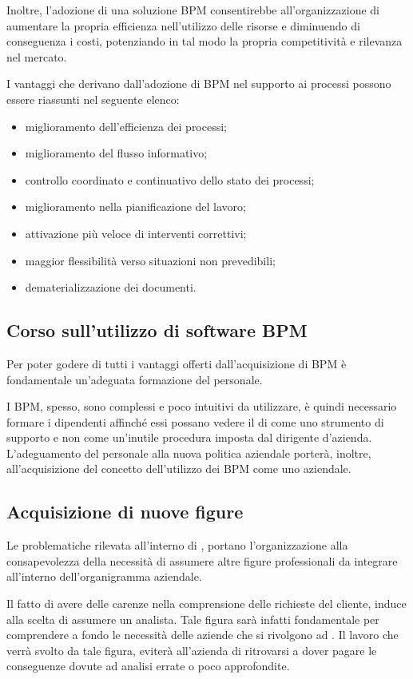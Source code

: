 Inoltre, l'adozione di una soluzione BPM consentirebbe all'organizzazione di aumentare la propria efficienza nell'utilizzo delle risorse e diminuendo di conseguenza i costi, potenziando in tal modo la propria competitività e rilevanza nel mercato.

I vantaggi che derivano dall'adozione di \sw BPM nel supporto ai processi possono essere riassunti nel seguente elenco:

\begin{itemize}
	\item miglioramento dell'efficienza dei processi;
	\item miglioramento del flusso informativo;
	\item controllo coordinato e continuativo dello stato dei processi;
	\item miglioramento nella pianificazione del lavoro;
	\item attivazione più veloce di interventi correttivi;
	\item maggior flessibilità verso situazioni non prevedibili;
	\item dematerializzazione dei documenti.
\end{itemize}


\subsection{Corso sull'utilizzo di software BPM}
Per poter godere di tutti i vantaggi offerti dall'acquisizione di \sw BPM è fondamentale un'adeguata formazione del personale.

I \sw BPM, spesso, sono complessi e poco intuitivi da utilizzare, è quindi necessario formare i dipendenti affinché essi possano 
vedere il \sw di  come uno strumento di supporto e non come un'inutile procedura imposta dal dirigente d'azienda.
L'adeguamento del personale alla nuova politica aziendale porterà, inoltre, all'acquisizione del concetto dell'utilizzo dei \sw BPM come uno  aziendale.

\subsection{Acquisizione di nuove figure}
Le problematiche rilevata all'interno di \customer , portano l'organizzazione alla consapevolezza della necessità di assumere altre figure professionali da integrare all'interno dell'organigramma aziendale.

Il fatto di avere delle carenze nella comprensione delle richieste del cliente, induce \customer alla scelta di assumere un analista. Tale figura sarà infatti fondamentale per comprendere a fondo le necessità delle aziende che si rivolgono ad \customer. Il lavoro che verrà svolto da tale figura, eviterà all'azienda di ritrovarsi a dover pagare le conseguenze dovute ad analisi errate o poco approfondite.


